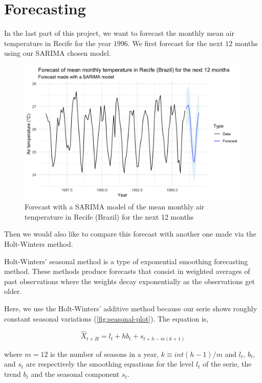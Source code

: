 \section{Forecasting}

In the last part of this project, we want to forecast the monthly mean air temperature in Recife for the year $1996$. We first forecast for the next $12$ months using our SARIMA chosen model.

\begin{figure}[H]
	\centering
	\includegraphics{figures/forecast/sarima_forecast.png}
	\caption{Forecast with a SARIMA model of the mean monthly air temperature in Recife (Brazil) for the next 12 months}
	\label{fig:sarima-forecast}
\end{figure}

Then we would also like to compare this forecast with another one made via the Holt-Winters method.

Holt-Winters' seasonal method is a type of exponential smoothing forecasting method. These methods produce forecasts that consist in weighted averages of past observations where the weights decay exponentially as the observations get older.

Here, we use the Holt-Winters' additive method because our serie shows roughly constant seasonal variations (\autoref{fig:seasonal-plot}). The equation is, 

\begin{equation}
	\hat{X}_{t + H} = l_t + h b_t + s_{t + h - m(k + 1)}
\end{equation}

where $m = 12$ is the number of seasons in a year, $k \equiv int(h - 1) / m$ and $l_t$, $b_t$, and $s_t$ are respectively the smoothing equations for the level $l_t$ of the serie, the trend $b_t$ and the seasonal component $s_t$.

